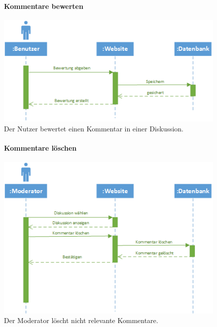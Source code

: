 \documentclass[12pt,a4paper]{article}
\begin{document}
\begin{figure}[H]
	\centering
	\paragraph{Kommentare bewerten}
	\includegraphics[width=\textwidth]{Bilder/Sequenzdiagramme/KommentarBewerten.png}
	\caption{Der Nutzer bewertet einen Kommentar in einer Diskussion.}
	\label{SzKommentareBewerten}
\end{figure}
\begin{figure}[H]
	\centering
	\paragraph{Kommentare löschen}
	\includegraphics[width=\textwidth]{Bilder/Sequenzdiagramme/KommentarLoeschen.png}
	\caption{Der Moderator löscht nicht relevante Kommentare.}
	\label{SzKommentarLoeschen}
\end{figure}
\end{document}
